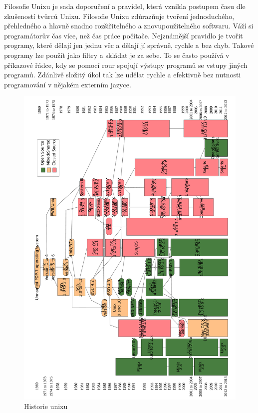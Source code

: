 \documentclass[thesis=M,czech]{FITthesis}[2012/06/26]
\begin{document}
Filosofie Unixu je sada doporučení a pravidel, která vznikla postupem času dle zkušeností tvůrců Unixu. Filosofie Unixu zdůrazňuje tvoření jednoduchého, přehledného a hlavně snadno rozšiřitelného a znovupoužitelného softwaru. Váží si programátorův čas více, než čas práce počítače. Nejznámější pravidlo je tvořit programy, které dělají jen jednu věc a dělají jí správně, rychle a bez chyb. Takové programy lze použít jako filtry a skládat je za sebe. To se často používá v příkazové řádce, kdy se pomocí rour spojují výstupy programů se vstupy jiných programů. Zdánlivě složitý úkol tak lze udělat rychle a efektivně bez nutnosti programování v nějakém externím jazyce.


\begin{figure}
	\includegraphics[width=1.0\textwidth]{./images/Unix_history-simple_rot_big}
	\caption{Historie unixu}
	\label{fig:unixhistory}
\end{figure}
\end{document}
